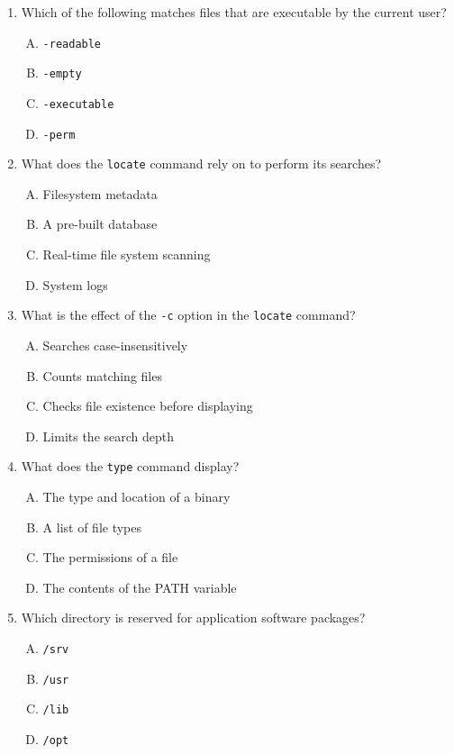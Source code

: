 \documentclass[a4paper]{report}
\begin{document}
\begin{enumerate}[1.]
    \item Which of the following matches files that are executable by the current user?  
    \begin{enumerate}[A)]
        \item \texttt{-readable}  
        \item \texttt{-empty}  
        \item \texttt{-executable}  
        \item \texttt{-perm}  
    \end{enumerate}

    \item What does the \texttt{locate} command rely on to perform its searches?  
    \begin{enumerate}[A)]
        \item Filesystem metadata  
        \item A pre-built database  
        \item Real-time file system scanning  
        \item System logs  
    \end{enumerate}

    \item What is the effect of the \texttt{-c} option in the \texttt{locate} command?  
    \begin{enumerate}[A)]
        \item Searches case-insensitively  
        \item Counts matching files  
        \item Checks file existence before displaying  
        \item Limits the search depth  
    \end{enumerate}

    \item What does the \texttt{type} command display?  
    \begin{enumerate}[A)]
        \item The type and location of a binary  
        \item A list of file types  
        \item The permissions of a file  
        \item The contents of the PATH variable  
    \end{enumerate}

    \item Which directory is reserved for application software packages?  
    \begin{enumerate}[A)]
        \item \texttt{/srv}  
        \item \texttt{/usr}  
        \item \texttt{/lib}  
        \item \texttt{/opt}  
    \end{enumerate}


\end{enumerate}
\end{document}
